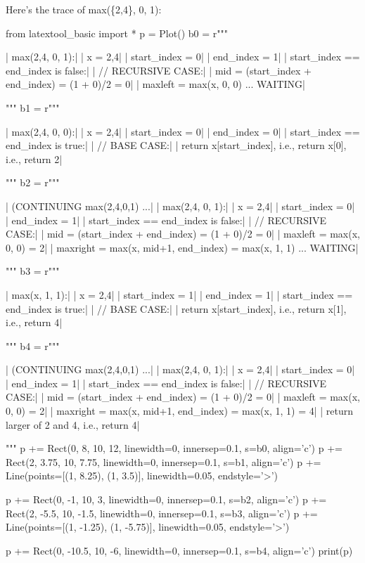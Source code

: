 Here's the trace of max(\{2,4\}, 0, 1):
\begin{python}
from latextool_basic import *
p = Plot()
b0 = r"""
\begin{consolethree}[escapeinside=||]
|{ \tiny max({2,4}, 0, 1):}|
    |{ \tiny x = {2,4}}|
    |{ \tiny start\_index = 0}|
    |{ \tiny end\_index = 1}|
    |{ \tiny start\_index == end\_index is false:}|
        |{ \tiny // RECURSIVE CASE:}|
        |{ \tiny mid = (start\_index + end\_index) = (1 + 0)/2 = 0}|
        |{ \tiny maxleft = max(x, 0, 0) ... WAITING}|
\end{consolethree}
"""
b1 = r"""
\begin{consolethree}[escapeinside=||]
|{ \tiny max({2,4}, 0, 0):}|
    |{ \tiny x = {2,4}}|
    |{ \tiny start\_index = 0}|
    |{ \tiny end\_index = 0}|
    |{ \tiny start\_index == end\_index is true:}|
        |{ \tiny // BASE CASE:}|
        |{ \tiny return x[start\_index], i.e., return x[0], i.e., return 2}|
\end{consolethree}
"""
b2 = r"""
\begin{consolethree}[escapeinside=||]
|{ \tiny (CONTINUING max({2,4},0,1) ...}|
|{ \tiny max({2,4}, 0, 1):}|
    |{ \tiny x = {2,4}}|
    |{ \tiny start\_index = 0}|
    |{ \tiny end\_index = 1}|
    |{ \tiny start\_index == end\_index is false:}|
        |{ \tiny // RECURSIVE CASE:}|
        |{ \tiny mid = (start\_index + end\_index) = (1 + 0)/2 = 0}|
        |{ \tiny maxleft = max(x, 0, 0) = 2}|
        |{ \tiny maxright = max(x, mid+1, end\_index) = max(x, 1, 1) ... WAITING}|
\end{consolethree}
"""
b3 = r"""
\begin{consolethree}[escapeinside=||]
|{ \tiny max(x, 1, 1):}|
    |{ \tiny x = {2,4}}|
    |{ \tiny start\_index = 1}|
    |{ \tiny end\_index = 1}|
    |{ \tiny start\_index == end\_index is true:}|
        |{ \tiny // BASE CASE:}|
        |{ \tiny return x[start\_index], i.e., return x[1], i.e., return 4}|
\end{consolethree}
"""
b4 = r"""
\begin{consolethree}[escapeinside=||]
|{ \tiny (CONTINUING max({2,4},0,1) ...}|
|{ \tiny max({2,4}, 0, 1):}|
    |{ \tiny x = {2,4}}|
    |{ \tiny start\_index = 0}|
    |{ \tiny end\_index = 1}|
    |{ \tiny start\_index == end\_index is false:}|
        |{ \tiny // RECURSIVE CASE:}|
        |{ \tiny mid = (start\_index + end\_index) = (1 + 0)/2 = 0}|
        |{ \tiny maxleft = max(x, 0, 0) = 2}|
        |{ \tiny maxright = max(x, mid+1, end\_index) = max(x, 1, 1) = 4}|
        |{ \tiny return larger of 2 and 4, i.e., return 4}|
\end{consolethree}
"""
p += Rect(0, 8, 10, 12, linewidth=0, innersep=0.1, s=b0, align='c')
p += Rect(2, 3.75, 10, 7.75, linewidth=0, innersep=0.1, s=b1, align='c')
p += Line(points=[(1, 8.25), (1, 3.5)], linewidth=0.05, endstyle='>')

p += Rect(0, -1, 10, 3, linewidth=0, innersep=0.1, s=b2, align='c')
p += Rect(2, -5.5, 10, -1.5, linewidth=0, innersep=0.1, s=b3, align='c')
p += Line(points=[(1, -1.25), (1, -5.75)], linewidth=0.05, endstyle='>')

p += Rect(0, -10.5, 10, -6, linewidth=0, innersep=0.1, s=b4, align='c')
print(p)
\end{python}
